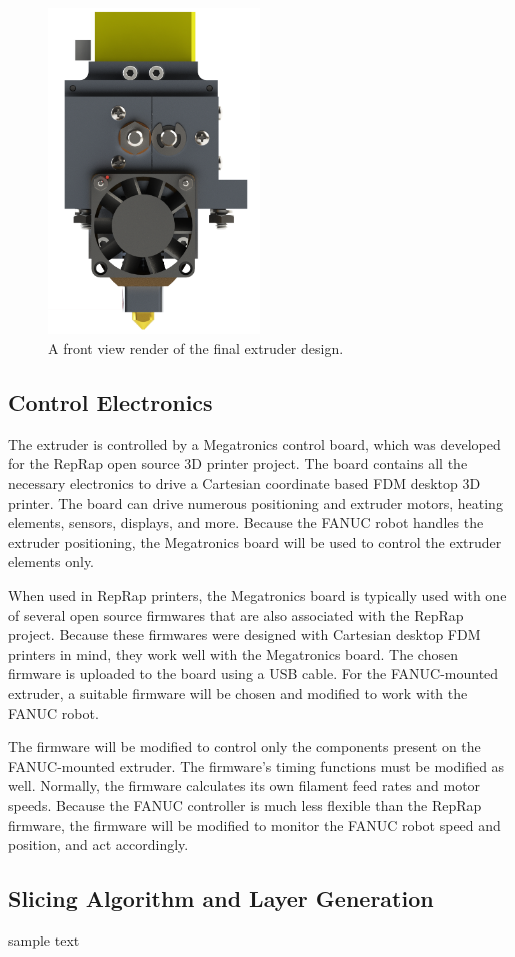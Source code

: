 \begin{figure}[htp]
\centering
\includegraphics[width=0.5\textwidth]{./figures/extruder-front}
\caption{A front view render of the final extruder design.}
\label{fig:extruder front}
\end{figure}

\clearpage

\subsection{Control Electronics}
\indent 

The extruder is controlled by a Megatronics control board, which was developed for the RepRap open source 3D printer project. The board contains all the necessary electronics to drive a Cartesian coordinate based FDM desktop 3D printer. The board can drive numerous positioning and extruder motors, heating elements, sensors, displays, and more. Because the FANUC robot handles the extruder positioning, the Megatronics board will be used to control the extruder elements only. 

When used in RepRap printers, the Megatronics board is typically used with one of several open source firmwares that are also associated with the RepRap project. Because these firmwares were designed with Cartesian desktop FDM printers in mind, they work well with the Megatronics board. The chosen firmware is uploaded to the board using a USB cable. For the FANUC-mounted extruder, a suitable firmware will be chosen and modified to work with the FANUC robot.

The firmware will be modified to control only the components present on the FANUC-mounted extruder. The firmware's timing functions must be modified as well. Normally, the firmware calculates its own filament feed rates and motor speeds. Because the FANUC controller is much less flexible than the RepRap firmware, the firmware will be modified to monitor the FANUC robot speed and position, and act accordingly. 

\subsection{Slicing Algorithm and Layer Generation}

\indent



sample text
